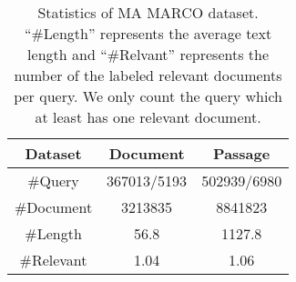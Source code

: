\documentclass[11pt]{article}
\begin{document}
\begin{table}[]
\caption{Statistics of MA MARCO dataset. ``\#Length'' represents the average text length and ``\#Relvant'' represents the number of the labeled relevant documents per query. We only count the query which at least has one relevant document.}
\label{tab:static}
\begin{tabular}{@{}c|c|c@{}}
\toprule
Dataset             & Document & Passage \\ \midrule
\#Query             & 367013/5193               & 502939/6980  \\
\#Document          & 3213835                   & 8841823  \\
\#Length            & 56.8                        &  1127.8     \\
\#Relevant  & 1.04                        & 1.06       \\ \bottomrule
\end{tabular}
\end{table}
\end{document}

